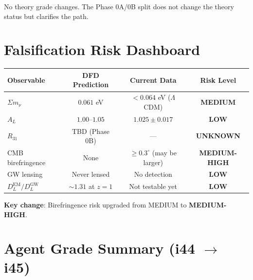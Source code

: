 \documentclass[11pt,a4paper]{article}
\begin{document}
No theory grade changes. The Phase 0A/0B split does not change the theory status but clarifies the path.

\section{Falsification Risk Dashboard}

\begin{center}
\begin{tabular}{lccc}
\toprule
\textbf{Observable} & \textbf{DFD Prediction} & \textbf{Current Data} & \textbf{Risk Level} \\
\midrule
$\Sigma m_\nu$ & $0.061$ eV & $< 0.064$ eV ($\Lambda$CDM) & \textcolor{dfdyellow}{\textbf{MEDIUM}} \\
$A_L$ & $1.00$--$1.05$ & $1.025 \pm 0.017$ & \textcolor{dfdgreen}{\textbf{LOW}} \\
$R_{31}$ & TBD (Phase 0B) & --- & \textcolor{dfdyellow}{\textbf{UNKNOWN}} \\
CMB birefringence & None & $\geq 0.3^\circ$ (may be larger) & \textcolor{dfdred}{\textbf{MEDIUM-HIGH}} \\
GW lensing & Never lensed & No detection & \textcolor{dfdgreen}{\textbf{LOW}} \\
$D_L^{\text{EM}}/D_L^{\text{GW}}$ & $\sim 1.31$ at $z=1$ & Not testable yet & \textcolor{dfdgreen}{\textbf{LOW}} \\
\bottomrule
\end{tabular}
\end{center}

\textbf{Key change}: Birefringence risk upgraded from MEDIUM to \textbf{MEDIUM-HIGH}.

\section{Agent Grade Summary (i44 $\to$ i45)}
\end{document}
